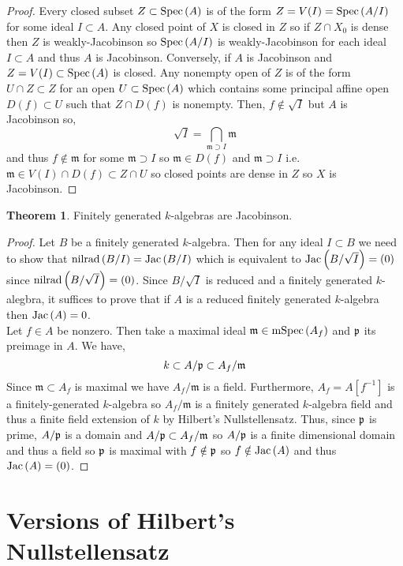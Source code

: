 \documentclass[12pt]{extarticle}
\theoremstyle{definition}
\newtheorem{theorem}{Theorem}[section]
\newcommand{\m}{\mathfrak{m}}
\begin{document}
\begin{proof}
Every closed subset $Z \subset \mathrm{Spec}\left(A\right)$ is of the form $Z = V(I) = \mathrm{Spec}\left(A / I\right)$ for some ideal $I \subset A$. Any closed point of $X$ is closed in $Z$ so if $Z \cap X_0$ is dense then $Z$ is weakly-Jacobinson so $\mathrm{Spec}\left(A / I\right)$ is weakly-Jacobinson for each ideal $I \subset A$ and thus $A$ is Jacobinson. Conversely, if $A$ is Jacobinson and $Z = V(I) \subset \mathrm{Spec}\left(A\right)$ is closed. Any nonempty open of $Z$ is of the form $U \cap Z \subset Z$ for an open $U \subset \mathrm{Spec}\left(A\right)$ which contains some principal affine open $D(f) \subset U$ such that $Z \cap D(f)$ is nonempty. Then, $f \notin \sqrt{I}$ but $A$ is Jacobinson so,
\[ \sqrt{I} = \bigcap_{\m \supset I} \m \]
and thus $f \notin \m$ for some $\m \supset I$ so $\m \in D(f)$ and $\m \supset I$ i.e. $\m \in V(I) \cap D(f) \subset Z \cap U$ so closed points are dense in $Z$ so $X$ is Jacobinson.
\end{proof}

\begin{theorem}
Finitely generated $k$-algebras are Jacobinson.
\end{theorem}

\begin{proof}
Let $B$ be a finitely generated $k$-algebra. Then for any ideal $I \subset B$ we need to show that $\mathrm{nilrad}\left(B / I\right) = \mathrm{Jac}\left( B / I \right)$ which is equivalent to $\mathrm{Jac}\left( B / \sqrt{I} \right) = (0)$ since $\mathrm{nilrad}\left(B / \sqrt{I}\right) = (0)$. Since $B / \sqrt{I}$ is reduced and a finitely generated $k$-alegbra, it suffices to prove that if $A$ is a reduced finitely generated $k$-algebra then $\mathrm{Jac}\left( A \right) = 0$.
\bigskip\\
Let $f \in A$ be nonzero. Then take a maximal ideal $\m \in \mSpec{A_f}$ and $\mathfrak{p}$ its preimage in $A$. We have,
\[ k \subset A / \p \subset A_f / \m \]
Since $\m \subset A_f$ is maximal we have $A_f / \m$ is a field. Furthermore, $A_f = A[f^{-1}]$ is a finitely-generated $k$-algebra so $A_f / \m$ is a finitely generated $k$-algebra field and thus a finite field extension of $k$ by Hilbert's Nullstellensatz. Thus, since $\mathfrak{p}$ is prime, $A / \mathfrak{p}$ is a domain and $A / \p \subset A_f / \m$ so $A / \mathfrak{p}$ is a finite dimensional domain and thus a field so $\mathfrak{p}$ is maximal with $f \notin \mathfrak{p}$ so $f \notin \mathrm{Jac}\left( A \right)$ and thus $\mathrm{Jac}\left( A \right) = (0)$. 
\end{proof}


\section{Versions of Hilbert's Nullstellensatz}
\end{document}
